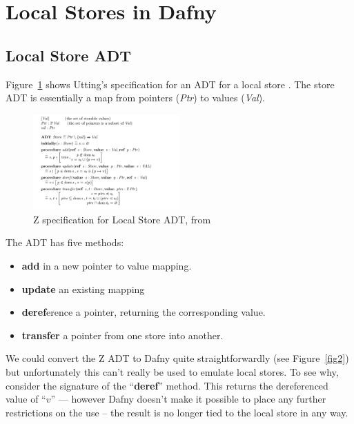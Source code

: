\section{Local Stores in Dafny}

\subsection{Local Store ADT}

Figure~\ref{fig1} shows Utting's specification for an ADT for a local
store \cite{utting1995,utting1998}.  The store ADT is essentially a
map from pointers (\textit{Ptr}) to values (\textit{Val}).

\begin{figure}[t]
\centering
\includegraphics[width=0.5\textwidth]{LocalStoreADT.pdf}
\caption{Z specification for Local Store ADT, from
  \citet{utting1995,utting1998}}
\label{fig1}
\end{figure}

The ADT has five methods:
\begin{itemize}
\item \textbf{add} in a new pointer to value mapping.
\item \textbf{update} an existing mapping
\item \textbf{deref}erence a pointer, returning the corresponding
  value.
\item \textbf{transfer} a pointer from one store into another.
\end{itemize}

We could convert the Z ADT to Dafny quite straightforwardly (see
Figure~\ref{fig2}) but unfortunately this can't really be used to
emulate local stores.  To see why, consider the signature of the
``\textbf{deref}'' method. This returns the dereferenced value of
``$v$'' --- however Dafny doesn't make it possible to place any
further restrictions on the use -- the result is no longer tied to the
local store in any way.

